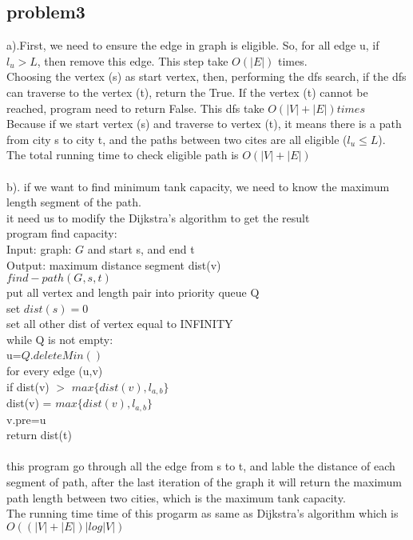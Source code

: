 \documentclass[11pt]{article}
\newcommand\tab[1][1cm]{\hspace*{#1}}
\begin{document}
\subsection{problem3}
a).First, we need to ensure the edge in graph is eligible. So, for all edge u, if $l_u > L$, then remove this edge. This step take $O(|E|)$ times. \\ Choosing the vertex (s) as start vertex, then, performing the dfs search, if the dfs can traverse to the vertex (t), return the True. If the vertex (t) cannot be reached, program need to return False. This dfs take $O(|V|+|E|) times$ \\ Because if we start vertex (s) and traverse to vertex (t), it means there is a path from city s to city t, and the paths between two cites are all eligible ($l_u \leq L$). \\
The total running time to check eligible path is $O(|V|+|E|)$\\
\\
b). if we want to find minimum tank capacity, we need to know the maximum length segment of the path. \\ 
it need us to modify the Dijkstra's algorithm to get the result
\\
program find capacity: \\
Input:  graph: $G$ and start s, and end t\\
Output: maximum distance segment dist(v) \\
$find-path(G,s,t)$\\
put all vertex and length pair into priority queue Q\\
set $dist(s)=0$\\
set all other dist of vertex equal to INFINITY\\
while Q is not empty:\\
\tab u=$Q.deleteMin()$\\
\tab for every edge (u,v)\\
\tab \tab if dist(v) $>$ $max\{dist(v), l_{a,b}\}$\\
\tab \tab \tab dist(v) = $max\{dist(v), l_{a,b}\}$\\
\tab \tab \tab v.pre=u \\
return dist(t)\\
\\ 
this program go through all the edge from s to t, and lable the distance of each segment of path, after the last iteration of the graph it will return the maximum path length between two cities, which is the maximum tank capacity. \\
The running time time of this progarm as same as Dijkstra's algorithm which is $O((|V|+|E|)|log|V|)$
\end{document}
